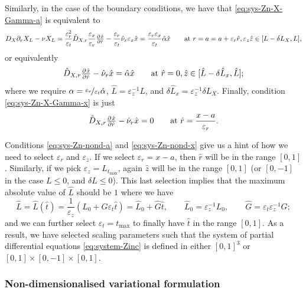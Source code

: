 \documentclass[11pt]{article}
\numberwithin{equation}{section}
\begin{document}
Similarly, in the case of the boundary conditions, we have that \eqref{eq:sys-Zn-X-Gamma-a} is equivalent to
\[
    D_X \partial_r X_L - \nu X_L = 
    \frac{\varepsilon_r^2}{\varepsilon_t} \hat{D}_{X,r} \frac{\varepsilon_x}{\varepsilon_r} \pd{\hat{x}}{\hat{r}} - \frac{\varepsilon_r}{\varepsilon_t} \hat{\nu}_r \varepsilon_x \hat{x} = \frac{\varepsilon_r \varepsilon_x}{\varepsilon_t} \hat{\alpha} \hat{x}
    \qquad \text{at } r = a = a + \varepsilon_r \hat{r}, \varepsilon_z \hat{z} \in [L - \delta L_X, L],
\]
or equivalently
\begin{equation}
    \label{eq:sys-Zn-nond-a}
    \hat{D}_{X,r} \pd{\hat{x}}{\hat{r}} - \hat{\nu}_r \hat{x} = \hat{\alpha} \hat{x}
    \qquad \text{at } \hat{r} = 0, \hat{z} \in [\hat{L} - \delta \hat{L}_x, \hat{L}];
\end{equation}
where we require \( \alpha = \nicefrac{\varepsilon_r}{\varepsilon_t} \hat{\alpha}\), \( \hat{L} = \varepsilon_z^{-1} L\), and \( \delta\hat{L}_x = \varepsilon_z^{-1} \delta L_X\). Finally, condition \eqref{eq:sys-Zn-X-Gamma-x} is just
\begin{equation}
    \label{eq:sys-Zn-nond-x}
    \hat{D}_{X,r} \pd{\hat{x}}{\hat{r}} - \hat{\nu}_r \hat{x} = 0
    \qquad \text{at } \hat{r} = \frac{x-a}{\varepsilon_r}.
\end{equation}

Conditions \eqref{eq:sys-Zn-nond-a} and \eqref{eq:sys-Zn-nond-x} give us a hint of how we need to select \(\varepsilon_r\) and \(\varepsilon_z\). If we select \( \varepsilon_r = x-a\), then \( \hat{r} \) will be in the range \( [0,1]\). Similarly, if we pick \( \varepsilon_z = L_{t_{\max}}\), again \(\hat z \) will be in the range \( [0,1]\) (or \([0,-1]\) in the case \(L\leq 0\), and \(\delta L \leq 0\)). This last selection implies that the maximum absolute value of \( \hat{L}\) should be \(1\) where we have
\[
    \hat{L} = \hat{L}(\hat t) = \frac{1}{\varepsilon_z} ( L_0 + G \varepsilon_t \hat t )
    = \hat{L}_0 + \hat{G} \hat t,
    \qquad 
    \hat{L}_0 = \varepsilon^{-1}_z L_0,
    \qquad
    \hat{G} = \varepsilon_t \varepsilon_z^{-1} G;
\]
and we can further select \( \varepsilon_t = t_{\max}\) to finally have \( \hat t\) in the range \( [0,1]\). As a result, we have selected scaling parameters such that the system of partial differential equations  \eqref{eq:system-Zinc} is defined in either \( [0,1]^3\) or \([0,1]\times [0,-1] \times [0,1]\).


\subsubsection{Non-dimensionalised variational formulation}
\end{document}
